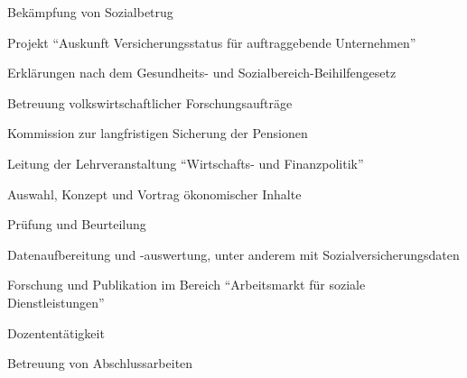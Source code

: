 
{\begin{cvenumerate}
		\item Bekämpfung von Sozialbetrug
		\item Projekt "`Auskunft Versicherungsstatus für auftraggebende Unternehmen"'
		\item Erklärungen nach dem Gesundheits- und Sozialbereich-Beihilfengesetz
		\item Betreuung volkswirtschaftlicher Forschungsaufträge
		\item Kommission zur langfristigen Sicherung der Pensionen
	\end{cvenumerate}}

{\begin{cvenumerate}
		\item Leitung der Lehrveranstaltung "`Wirtschafts- und Finanzpolitik"'
		\item Auswahl, Konzept und Vortrag ökonomischer Inhalte
		\item Prüfung und Beurteilung
	\end{cvenumerate}}

	{\begin{cvenumerate}
		\item Datenaufbereitung und -auswertung, unter anderem mit Sozialversicherungsdaten
		\item Forschung und Publikation im Bereich "`Arbeitsmarkt für soziale Dienstleistungen"'
		\item Dozententätigkeit
		\item Betreuung von Abschlussarbeiten
	\end{cvenumerate}}

